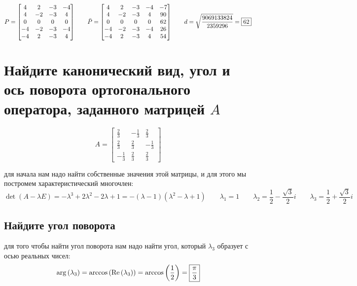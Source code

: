 \documentclass{article}
\newcommand{\ds}{\displaystyle}
\renewcommand{\f}{\frac}
\renewcommand{\l}{\left}
\renewcommand{\r}{\right}
\begin{document}
  $$ P = \left[\begin{matrix}4 & 2 & -3 & -4\\4 & -2 & -3 & 4\\0 & 0 & 0 & 0\\-4 & -2 & -3 & -4\\-4 & 2 & -3 & 4\end{matrix}\right] \qquad \bar{P} = \left[\begin{matrix}4 & 2 & -3 & -4 & -7\\4 & -2 & -3 & 4 & 90\\0 & 0 & 0 & 0 & 62\\-4 & -2 & -3 & -4 & 26\\-4 & 2 & -3 & 4 & 54\end{matrix}\right] \qquad d = \sqrt{\f{9069133824}{2359296}} = \fbox{62} $$

  \section{Найдите канонический вид, угол и ось поворота ортогонального оператора, заданного матрицей $A$}
  $$ A = \left[\begin{matrix}\frac{2}{3} & - \frac{1}{3} & \frac{2}{3}\\\frac{2}{3} & \frac{2}{3} & - \frac{1}{3}\\- \frac{1}{3} & \frac{2}{3} & \frac{2}{3}\end{matrix}\right] $$

  \noindent
  для начала нам надо найти собственные значения этой матрицы, и для этого мы постромем характеристический многочлен:
  $$ \det(A-\lambda E) = - \lambda^3 + 2 \lambda^2 - 2 \lambda + 1 = -\l(\lambda - 1\r)\l(\lambda^2 - \lambda + 1\r) \qquad
  \lambda_1 = 1 \qquad
  \lambda_2 = \f{1}{2} - \f{\sqrt{3}}{2}i \qquad
  \lambda_3 = \f{1}{2} + \f{\sqrt{3}}{2}i $$

  \subsection{Найдите угол поворота}
  для того чтобы найти угол поворота нам надо найти угол, который $\lambda_3$ образует с осью реальных чисел:
  $$ \arg\l(\lambda_3\r) = \arccos\l(\operatorname{Re}\l(\lambda_3\r)\r) = \arccos\l(\f{1}{2}\r) = \fbox{$\ds\f{\pi}{3}$} $$
\end{document}
